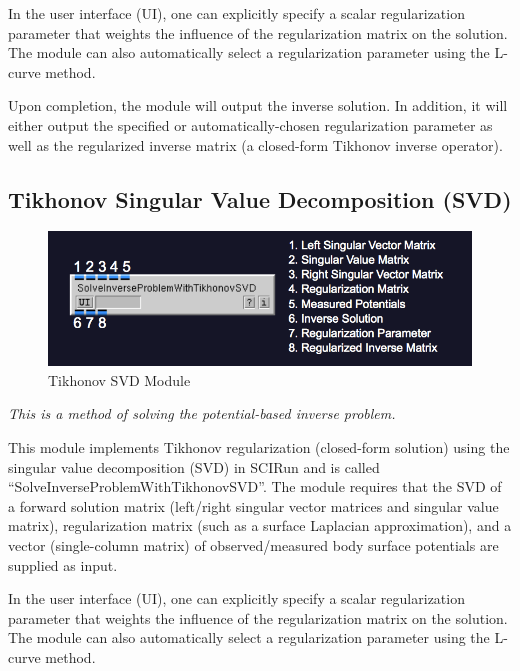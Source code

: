 In the user interface (UI), one can explicitly specify a scalar regularization parameter that weights the influence of the regularization matrix on the solution. The module can also automatically select a regularization parameter using the L-curve method.

Upon completion, the module will output the inverse solution. In addition, it will either output the specified or automatically-chosen regularization parameter as well as the regularized inverse matrix (a closed-form Tikhonov inverse operator).


\subsection{Tikhonov Singular Value Decomposition (SVD)}

\begin{figure}[H]
\begin{center}
\includegraphics[width=\textwidth]{ECGToolkitGuide_figures/SolveInverseProblemWithTikhonovSVD.png}
\caption{Tikhonov SVD Module}
\label{tikhonovsvd}
\end{center}
\end{figure}

\vspace{5pt}\textit{This is a method of solving the potential-based inverse problem.}\vspace{5pt}

This module implements Tikhonov regularization (closed-form solution) using the singular value decomposition (SVD) in SCIRun and is called ``SolveInverseProblemWithTikhonovSVD''. The module requires that the SVD of a forward solution matrix (left/right singular vector matrices and singular value matrix), regularization matrix (such as a surface Laplacian approximation), and a vector (single-column matrix) of observed/measured body surface potentials are supplied as input.

In the user interface (UI), one can explicitly specify a scalar regularization parameter that weights the influence of the regularization matrix on the solution. The module can also automatically select a regularization parameter using the L-curve method.

